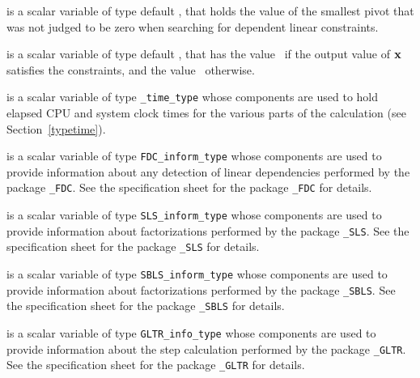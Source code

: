 \begin{description}
 is a scalar variable of type default \realdp,
that holds the value of the smallest pivot that was not judged to be zero
when searching for dependent linear constraints.

 is a scalar variable of type default \logical, that has the
value \true\ if the output value of ${\mathbf{x}}$ satisfies the constraints,
and the value \false\ otherwise.

 is a scalar variable of type {\tt \packagename\_time\_type}
whose components are used to hold elapsed CPU and system clock times for the
various parts of the calculation (see Section~\ref{typetime}).

 is a scalar variable of type
{\tt FDC\_inform\_type}
whose components are used to provide information about
any detection of linear dependencies
performed by the package
{\tt \libraryname\_FDC}.
See the specification sheet for the package
{\tt \libraryname\_FDC} for details.

 is a scalar variable of type
{\tt SLS\_inform\_type}
whose components are used to provide information about factorizations
performed by the package
{\tt \libraryname\_SLS}.
See the specification sheet for the package
{\tt \libraryname\_SLS} for details.

 is a scalar variable of type
{\tt SBLS\_inform\_type}
whose components are used to provide information about factorizations
performed by the package
{\tt \libraryname\_SBLS}.
See the specification sheet for the package
{\tt \libraryname\_SBLS} for details.

 is a scalar variable of type
{\tt GLTR\_info\_type}
whose components are used to provide information about
the step calculation performed by the package
{\tt \libraryname\_GLTR}.
See the specification sheet for the package
{\tt \libraryname\_GLTR} for details.

\end{description}
